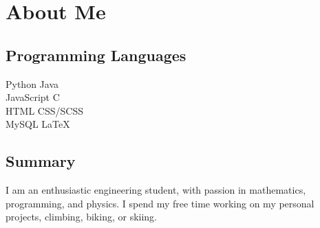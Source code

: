 \documentclass[]{deedy-resume-openfont}
\begin{document}
\section{About Me}
\begin{minipage}[t]{.35\textwidth}
	\subsection{Programming Languages}
	Python \textbullet{} Java \\
	JavaScript \textbullet{} C \\
	HTML \textbullet{} CSS/SCSS \\
	MySQL \textbullet{} \LaTeX

	\sectionsep
\end{minipage}
\hfill
\begin{minipage}[t]{.55\textwidth}
	\subsection{Summary}
    I am an enthusiastic engineering student, with passion in mathematics, programming, and physics. I spend my free time working on my personal projects, climbing, biking, or skiing.

    \vspace{15pt}
    
\end{minipage}
\end{document}
